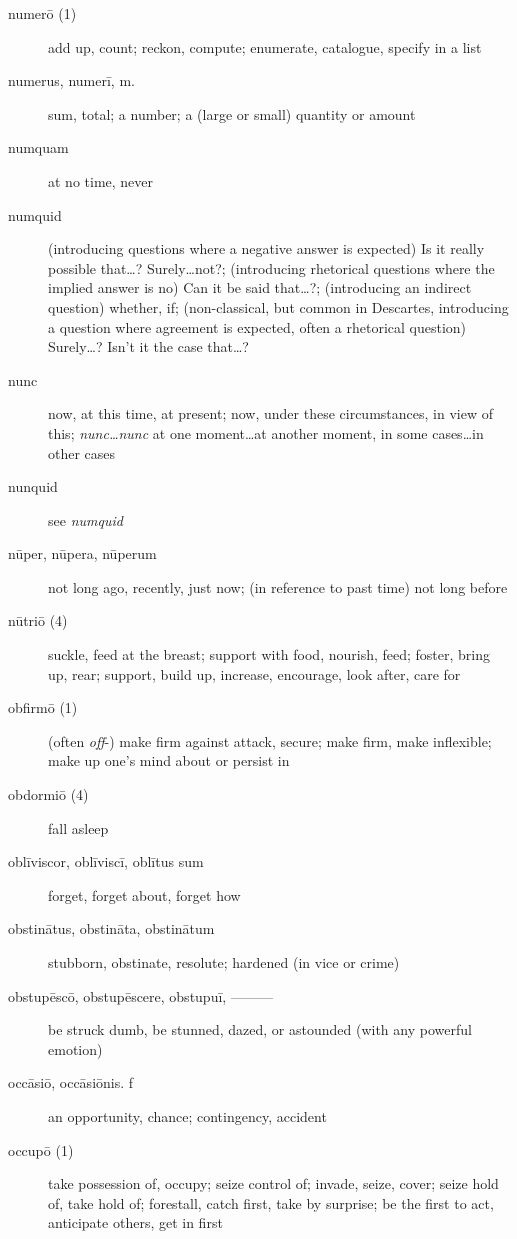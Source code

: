 \begin{description}
    \item[numerō (1)] add up, count; reckon, compute; enumerate, catalogue, specify in a list
    \item[numerus, numerī, m.] \marginnote{*}sum, total; a number; a (large or small) quantity or amount
    \item[numquam] \marginnote{*}at no time, never
    \item[numquid] (introducing questions where a negative answer is expected) Is it really possible that\dots ? Surely\dots not?; (introducing rhetorical questions where the implied answer is no) Can it be said that\dots ?; (introducing an indirect question) whether, if; (non-classical, but common in Descartes, introducing a question where agreement is expected, often a rhetorical question) Surely\dots ? Isn't it the case that\dots ?
    \item[nunc] \marginnote{*}now, at this time, at present; now, under these circumstances, in view of this; \textit{nunc\dots nunc} at one moment\dots at another moment, in some cases\dots in other cases
    \item[nunquid] see \textit{numquid}
    \item[nūper, nūpera, nūperum] not long ago, recently, just now; (in reference to past time) not long before
    \item[nūtriō (4)] suckle, feed at the breast; support with food, nourish, feed; foster, bring up, rear; support, build up, increase, encourage, look after, care for
    \item[obfirmō (1)] (often \textit{off}-) make firm against attack, secure; make firm, make inflexible; make up one's mind about or persist in
    \item[obdormiō (4)] fall asleep
    \item[oblīviscor, oblīviscī, oblītus sum] forget, forget about, forget how
    \item[obstinātus, obstināta, obstinātum] stubborn, obstinate, resolute; hardened (in vice or crime)
    \item[obstupēscō, obstupēscere, obstupuī, ———] be struck dumb, be stunned, dazed, or astounded (with any powerful emotion)
    \item[occāsiō, occāsiōnis. f] an opportunity, chance; contingency, accident
    \item[occupō (1)] \marginnote{*}take possession of, occupy; seize control of; invade, seize, cover; seize hold of, take hold of; forestall, catch first, take by surprise; be the first to act, anticipate others, get in first

\end{description}
